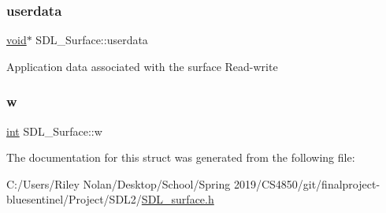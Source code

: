 \subsubsection{\texorpdfstring{userdata}{userdata}}
{\footnotesize\ttfamily \mbox{\hyperlink{_s_d_l__opengles2__gl2ext_8h_ae5d8fa23ad07c48bb609509eae494c95}{void}}$\ast$ S\+D\+L\+\_\+\+Surface\+::userdata}

Application data associated with the surface Read-\/write \mbox{\label{struct_s_d_l___surface_a9b0ec7185dcdb2a3530a9160a6ea83d9}} 
\subsubsection{\texorpdfstring{w}{w}}
{\footnotesize\ttfamily \mbox{\hyperlink{warnings_8h_a74f207b5aa4ba51c3a2ad59b219a423b}{int}} S\+D\+L\+\_\+\+Surface\+::w}



The documentation for this struct was generated from the following file\+:\begin{DoxyCompactItemize}
\item 
C\+:/\+Users/\+Riley Nolan/\+Desktop/\+School/\+Spring 2019/\+C\+S4850/git/finalproject-\/bluesentinel/\+Project/\+S\+D\+L2/\mbox{\hyperlink{_s_d_l__surface_8h}{S\+D\+L\+\_\+surface.\+h}}\end{DoxyCompactItemize}
